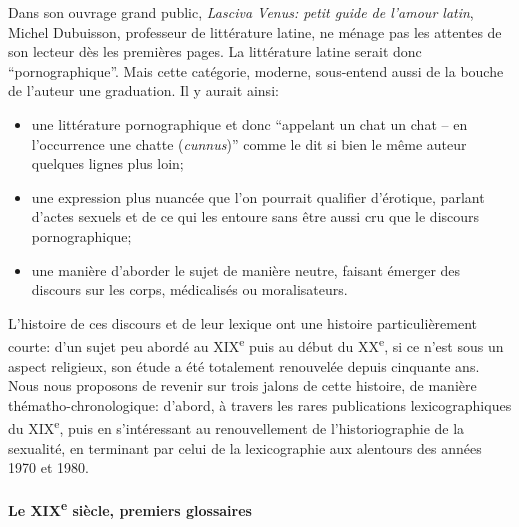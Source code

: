 Dans son ouvrage grand public, \textit{Lasciva Venus: petit guide de l'amour latin}, Michel Dubuisson, professeur de littérature latine, ne ménage pas les attentes de son lecteur dès les premières pages. La littérature latine serait donc \enquote{pornographique}. Mais cette catégorie, moderne, sous-entend aussi de la bouche de l'auteur une graduation. Il y aurait ainsi:
\begin{itemize}
    \item une littérature pornographique et donc \enquote{appelant un chat un chat -- en l'occurrence une chatte (\textit{cunnus})} comme le dit si bien le même auteur quelques lignes plus loin;
    \item une expression plus nuancée que l'on pourrait qualifier d'érotique, parlant d'actes sexuels et de ce qui les entoure sans être aussi cru que le discours pornographique;
    \item une manière d'aborder le sujet de manière neutre, faisant émerger des discours sur les corps, médicalisés ou moralisateurs.
\end{itemize}

L'histoire de ces discours et de leur lexique ont une histoire particulièrement courte: d'un sujet peu abordé au XIX\textsuperscript{e} puis au début du XX\textsuperscript{e}, si ce n'est sous un aspect religieux, son étude a été totalement renouvelée depuis cinquante ans. Nous nous proposons de revenir sur trois jalons de cette histoire, de manière thématho-chronologique: d'abord, à travers les rares publications lexicographiques du XIX\textsuperscript{e}, puis en s'intéressant au renouvellement de l'historiographie de la sexualité, en terminant par celui de la lexicographie aux alentours des années 1970 et 1980.

\paragraph{Le XIX\textsuperscript{e} siècle, premiers glossaires}

